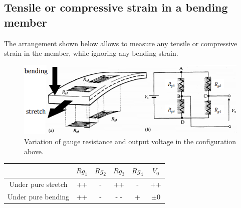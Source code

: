 \documentclass[class=report, crop=false, 12pt,a4paper]{standalone}
\begin{document}
\subsection{Tensile or compressive strain in a bending member}
The arrangement shown below allows to measure any tensile or compressive strain in the member, while ignoring any bending strain.
\begin{figure}[H]
  \centering
  \includegraphics[width = 0.8 \textwidth]{../img/diagram17.png}
  \caption{Variation of gauge resistance and output voltage in the configuration above.}
\end{figure} 
\begin{center}
  \begin{tabular}{||c | c c c c c||} 
    \hline
    & $Rg_1$ & $Rg_2$ & $Rg_3$ & $Rg_4$ & $V_0$\\
    \hline
    Under pure stretch & ++ & - & ++ & - & ++\\
    Under pure bending & ++ & - & - - & + & $\pm 0$ \\
    \hline 
 \end{tabular}
\end{center}
\end{document}
